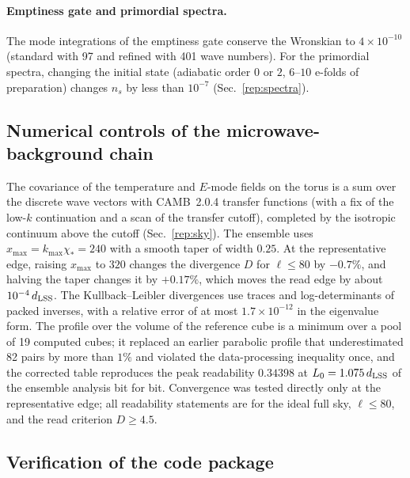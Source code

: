 \paragraph{Emptiness gate and primordial spectra.}
The mode integrations of the emptiness gate conserve the Wronskian to $4\times10^{-10}$ (standard with 97 and refined with 401 wave numbers). %
For the primordial spectra, changing the initial state (adiabatic order $0$ or $2$, $6$--$10$ e-folds of preparation) changes $n_s$ by less than $10^{-7}$ (Sec.~\ref{rep:spectra}). %

\subsection{Numerical controls of the microwave-background chain}\label{sec:v20-cmb}

The covariance of the temperature and $E$-mode fields on the torus is a sum over the discrete wave vectors with CAMB~2.0.4 transfer functions (with a fix of the low-$k$ continuation and a scan of the transfer cutoff), completed by the isotropic continuum above the cutoff (Sec.~\ref{rep:sky}).
The ensemble uses $x_{\max}=k_{\max}\chi_*=240$ with a smooth taper of width $0.25$.
At the representative edge, raising $x_{\max}$ to $320$ changes the divergence $D$ for $\ell\le80$ by $-0.7\%$, and halving the taper changes it by $+0.17\%$, which moves the read edge by about $10^{-4}\,d_{\mathrm{LSS}}$. %
The Kullback--Leibler divergences use traces and log-determinants of packed inverses, with a relative error of at most $1.7\times10^{-12}$ in the eigenvalue form. %
The profile over the volume of the reference cube is a minimum over a pool of 19 computed cubes; it replaced an earlier parabolic profile that underestimated 82 pairs by more than $1\%$ and violated the data-processing inequality once, and the corrected table reproduces the peak readability $0.34398$ at $L_0=1.075\,d_{\mathrm{LSS}}$ of the ensemble analysis bit for bit. %
Convergence was tested directly only at the representative edge; all readability statements are for the ideal full sky, $\ell\le80$, and the read criterion $D\ge4.5$. %

\subsection{Verification of the code package}\label{sec:v20-package}

